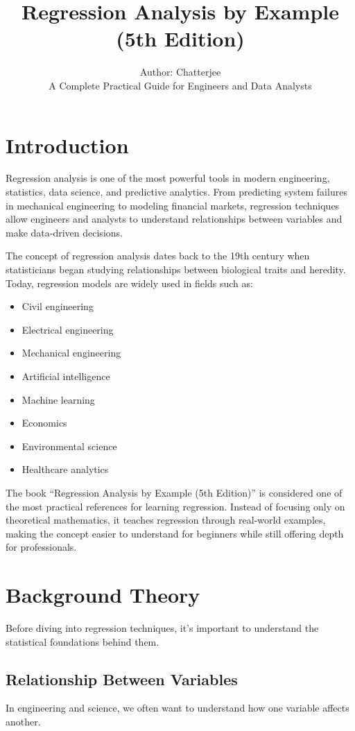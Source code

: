 \documentclass[12pt,a4paper]{article}
\title{Regression Analysis by Example \\ (5th Edition)}
\author{Author: Chatterjee \\ \small A Complete Practical Guide for Engineers and Data Analysts}
\date{}
\begin{document}
	
	\maketitle
	
	\tableofcontents
	\newpage
	
	\section{Introduction}
	Regression analysis is one of the most powerful tools in modern engineering, statistics, data science, and predictive analytics. From predicting system failures in mechanical engineering to modeling financial markets, regression techniques allow engineers and analysts to understand relationships between variables and make data-driven decisions.
	
	The concept of regression analysis dates back to the 19th century when statisticians began studying relationships between biological traits and heredity. Today, regression models are widely used in fields such as:
	\begin{itemize}
		\item Civil engineering
		\item Electrical engineering
		\item Mechanical engineering
		\item Artificial intelligence
		\item Machine learning
		\item Economics
		\item Environmental science
		\item Healthcare analytics
	\end{itemize}
	
	The book “Regression Analysis by Example (5th Edition)” is considered one of the most practical references for learning regression. Instead of focusing only on theoretical mathematics, it teaches regression through real-world examples, making the concept easier to understand for beginners while still offering depth for professionals.
	
	\section{Background Theory}
	Before diving into regression techniques, it’s important to understand the statistical foundations behind them.
	
	\subsection{Relationship Between Variables}
	In engineering and science, we often want to understand how one variable affects another.
	
\end{document}
